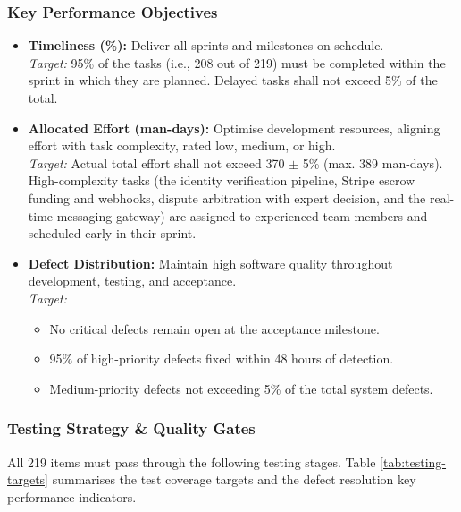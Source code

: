 \subsubsection{Key Performance Objectives}
\begin{itemize}
    \item \textbf{Timeliness (\%):} Deliver all sprints and milestones on schedule.\\
    \textit{Target:} 95\% of the tasks (i.e., 208 out of 219) must be completed within the sprint in which they are planned. Delayed tasks shall not exceed 5\% of the total.
    \item \textbf{Allocated Effort (man-days):} Optimise development resources, aligning effort with task complexity, rated low, medium, or high.\\
    \textit{Target:} Actual total effort shall not exceed 370 $\pm$ 5\% (max. 389 man-days). High-complexity tasks (the identity verification pipeline, Stripe escrow funding and webhooks, dispute arbitration with expert decision, and the real-time messaging gateway) are assigned to experienced team members and scheduled early in their sprint.
    \item \textbf{Defect Distribution:} Maintain high software quality throughout development, testing, and acceptance.\\
    \textit{Target:}
    \begin{itemize}
        \item No critical defects remain open at the acceptance milestone.
        \item 95\% of high-priority defects fixed within 48 hours of detection.
        \item Medium-priority defects not exceeding 5\% of the total system defects.
    \end{itemize}
\end{itemize}

\subsubsection{Testing Strategy \& Quality Gates}
All 219 items must pass through the following testing stages. Table \ref{tab:testing-targets} summarises the test coverage targets and the defect resolution key performance indicators.

